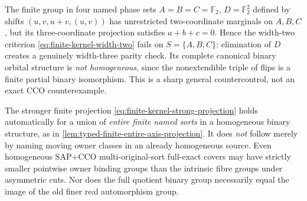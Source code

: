 \begin{remark}
\label{rem:finite-kernel-hidden-parity}
The finite group in four named phase sets
$A=B=C=\mathbb F_2$, $D=\mathbb F_2^2$
defined by shifts $(u,v,u+v,(u,v))$ has
unrestricted two-coordinate marginals on
$A,B,C$, but its three-coordinate
projection satisfies $a+b+c=0$. Hence the
width-two criterion \eqref{eq:finite-kernel-width-two}
fails on $S=\{A,B,C\}$: elimination of $D$
creates a genuinely width-three parity check.
Its complete canonical binary orbital structure
is \emph{not homogeneous}, since the
nonextendible triple of flips is a finite
partial binary isomorphism. This is a sharp
general countercontrol, not an exact CCO
counterexample.

The stronger finite projection
\eqref{eq:finite-kernel-strong-projection}
holds automatically for a union of \emph{entire
finite named sorts} in a homogeneous binary
structure, as in
\cref{lem:typed-finite-entire-axis-projection}.
It does \emph{not} follow merely by naming
moving owner classes in an already homogeneous
source. Even homogeneous SAP+CCO multi-original-sort
full-exact covers may have strictly smaller
pointwise owner binding groups than the intrinsic
fibre groups under asymmetric cuts. Nor does the
full quotient binary group necessarily equal the
image of the old finer real automorphism group.
\end{remark}
